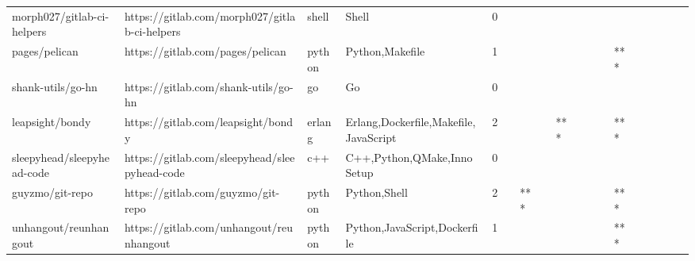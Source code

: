 \begin{tabular}{llllrlllllllllllll}
morph027/gitlab-ci-helpers                         &      https://gitlab.com/morph027/gitlab-ci-helpers &             shell &                                              Shell &       0 &         &        &           &                &                 &        &           &           &          &          &       &              &          \\
pages/pelican                                      &                   https://gitlab.com/pages/pelican &            python &                                    Python,Makefile &       1 &         &        &           &                &                 &        &           &       *** &          &          &       &              &          \\
shank-utils/go-hn                                  &               https://gitlab.com/shank-utils/go-hn &                go &                                                 Go &       0 &         &        &           &                &                 &        &           &           &          &          &       &              &          \\
leapsight/bondy                                    &                 https://gitlab.com/leapsight/bondy &            erlang &              Erlang,Dockerfile,Makefile,JavaScript &       2 &         &        &           &            *** &                 &        &           &       *** &          &          &       &              &          \\
sleepyhead/sleepyhead-code                         &      https://gitlab.com/sleepyhead/sleepyhead-code &               c++ &                        C++,Python,QMake,Inno Setup &       0 &         &        &           &                &                 &        &           &           &          &          &       &              &          \\
guyzmo/git-repo                                    &                 https://gitlab.com/guyzmo/git-repo &            python &                                       Python,Shell &       2 &         &    *** &           &                &                 &        &           &       *** &          &          &       &              &          \\
unhangout/reunhangout                              &           https://gitlab.com/unhangout/reunhangout &            python &                       Python,JavaScript,Dockerfile &       1 &         &        &           &                &                 &        &           &       *** &          &          &       &              &          \\

\end{tabular}
